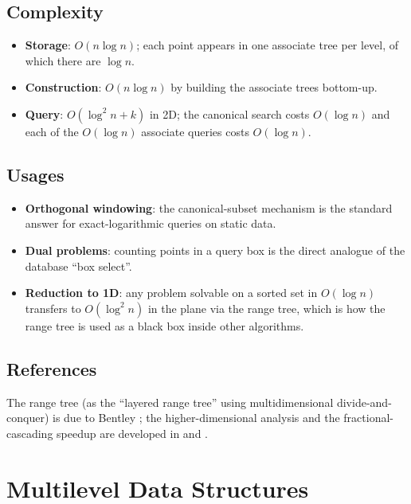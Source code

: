 \subsection{Complexity}

\begin{itemize}
  \item \textbf{Storage}: $O(n \log n)$; each point appears in one
    associate tree per level, of which there are $\log n$.
  \item \textbf{Construction}: $O(n \log n)$ by building the associate
    trees bottom-up.
  \item \textbf{Query}: $O(\log^2 n + k)$ in 2D; the canonical search costs
    $O(\log n)$ and each of the $O(\log n)$ associate queries costs
    $O(\log n)$.
\end{itemize}

\subsection{Usages}

\begin{itemize}
  \item \textbf{Orthogonal windowing}: the canonical-subset mechanism is
    the standard answer for exact-logarithmic queries on static data.
  \item \textbf{Dual problems}: counting points in a query box is the
    direct analogue of the database ``box select''.
  \item \textbf{Reduction to 1D}: any problem solvable on a sorted set in
    $O(\log n)$ transfers to $O(\log^2 n)$ in the plane via the range tree,
    which is how the range tree is used as a black box inside other
    algorithms.
\end{itemize}

\subsection{References}

The range tree (as the ``layered range tree'' using multidimensional
divide-and-conquer) is due to Bentley \cite{bentley1980multidim}; the
higher-dimensional analysis and the fractional-cascading speedup are
developed in \cite{berg2008} and \cite{willard1985}.

\section{Multilevel Data Structures}
\label{sec:rangesearch_multilevel}

